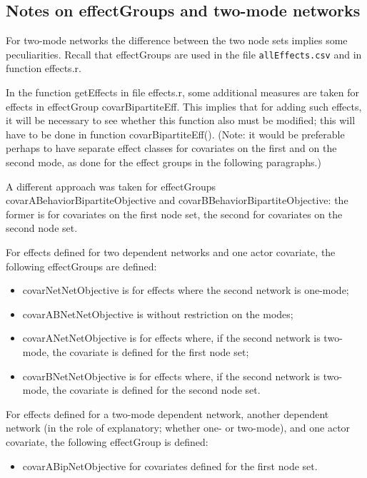 \documentclass[a4paper,fleqn,11pt]{article}
\newcommand{\+}{\, + \,}
\newcommand{\sfn}[1]{\textsf{#1}}
\begin{document}
\subsection{Notes on effectGroups and two-mode networks}
\label{S_notestwomode}

For two-mode networks the difference between the two node sets implies
some peculiarities.
Recall that effectGroups are used in the file \texttt{allEffects.csv}
and in function \sfn{effects.r}.

In the function \sfn{getEffects} in file \sfn{effects.r}, some additional
measures are taken for effects in effectGroup \sfn{covarBipartiteEff}.
This implies that for adding such effects, it will be necessary to see whether
this function also must be modified; this will have to be done
in function \sfn{covarBipartiteEff()}.
(Note: it would be preferable perhaps to have separate effect classes
for covariates on the first and on the second mode, as done for the effect
groups in the following paragraphs.)

A different approach was taken for effectGroups
\sfn{covarABehaviorBipartiteObjective} and \sfn{covarBBehaviorBipartiteObjective}:
the former is for covariates on the first node set, the second for
covariates on the second node set.

For effects defined for two dependent networks and one actor covariate,
the following effectGroups are defined:
\begin{itemize}
\item \sfn{covarNetNetObjective} is for effects where the second network is one-mode;
\item \sfn{covarABNetNetObjective} is without restriction on the modes;
\item \sfn{covarANetNetObjective}  is for effects where, if the second network is two-mode,
     the covariate is defined for the first node set;
\item \sfn{covarBNetNetObjective} is for effects where, if the second network is two-mode,
     the covariate is defined for the second node set.
\end{itemize}
\medskip

For effects defined for a two-mode dependent network, another dependent
network (in the role of explanatory; whether one- or two-mode), and one actor covariate,
the following effectGroup is defined:
\begin{itemize}
\item \sfn{covarABipNetObjective} for covariates defined for the first node set.
\end{itemize}
\medskip
\end{document}
